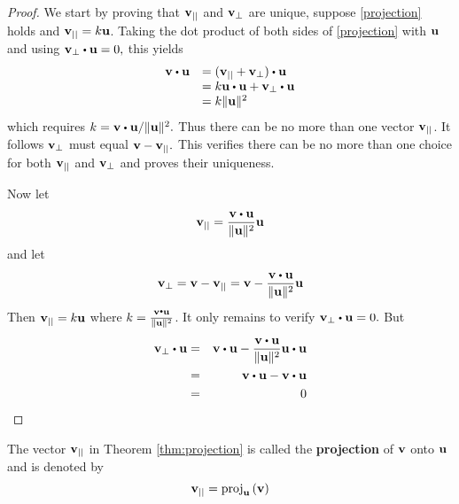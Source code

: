 \begin{proof}
We start by proving that ${\bf v}_{||}$ and ${\bf v}_{\bot}$ are unique, suppose \ref{projection} holds and ${\bf v}_{||}= k {\bf u}$.
 Taking the dot product of both sides of \ref{projection} with ${\bf u}$ and using $\vect{v}_{\bot }\dotprod \vect{u}=0,$
 this yields
\begin{equation*}
\begin{array}{ll}
\vect{v}\dotprod \vect{u} & = ( \vect{v}_{||}+\vect{v}_{\bot }) \dotprod \vect{u} \\
& =  k\vect{u} \dotprod \vect{u} + \vect{v}_{\bot} \dotprod \vect{u} \\
& = k \vectlength \vect{u}\vectlength ^{2}
\end{array}
\end{equation*}
which requires $k =\vect{v}\dotprod \vect{u} / \vectlength \vect{u}\vectlength ^{2}.$
Thus there can be no more than one vector ${\bf v}_{||}$. It follows 
${\bf v}_{\bot }$ must equal ${\bf v}-{\bf v}_{||}.$ This verifies there can
be no more than one choice for both ${\bf v}_{||}$ and ${\bf v}_{\bot
}$ and proves their uniqueness. 

Now let
\begin{equation*}
\vect{v}_{||} = 
\frac{\vect{v}\dotprod \vect{u}}{\vectlength \vect{u}\vectlength ^{2}}\vect{u}
\end{equation*}
and let
\begin{equation*}
\vect{v}_{\bot }=\vect{v}-\vect{v}_{||}=\vect{v}-\frac{\vect{v}\dotprod \vect{u}}
{\vectlength \vect{u}\vectlength ^{2}}\vect{u}
\end{equation*}
Then ${\bf v}_{||}= k{\bf u}$ where $k =\frac{\vect{v}\dotprod \vect{u}}{\vectlength \vect{u}\vectlength ^{2}}$.
 It only remains to
verify $\vect{v}_{\bot }\dotprod \vect{u}=0.$ But
\begin{eqnarray*}
\vect{v}_{\bot }\dotprod \vect{u} &=& \vect{v}\dotprod \vect{u}-\frac{\vect{v}\dotprod \vect{u}}{\vectlength \vect{u}\vectlength ^{2}}\vect{u}\dotprod \vect{u} \\
&=& \vect{v}\dotprod\vect{u}-\vect{v}\dotprod \vect{u}\\
&=& 0 
\end{eqnarray*}
\end{proof}

The vector ${\bf v}_{||}$ in Theorem \ref{thm:projection} is called the \textbf{projection}
of ${\bf v}$ onto ${\bf u}$ and is denoted by
\begin{equation*}
{\bf v}_{||}
=
\mbox{proj}_{{\bf u}}\left( {\bf v}\right)
\end{equation*}

